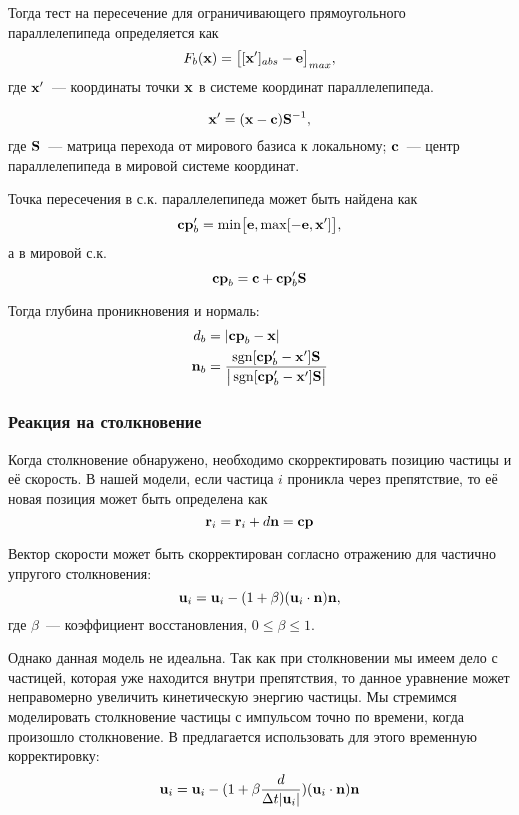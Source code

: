 Тогда тест на пересечение для ограничивающего прямоугольного параллелепипеда определяется как
\begin{equation}
  F_b(\boldsymbol{\mathbf{x}})=\big[[\boldsymbol{\mathbf{x}}']_{abs}-\boldsymbol{\mathbf{e}}\big]_{max},
\end{equation}
где $\boldsymbol{\mathbf{x}}'$~--- координаты точки $\boldsymbol{\mathbf{x}}$ в системе координат параллелепипеда.

\begin{equation}
  \boldsymbol{\mathbf{x}}'=(\boldsymbol{\mathbf{x}}-\boldsymbol{\mathbf{c}})\boldsymbol{\mathbf{S}}^{-1},
\end{equation}
где $\boldsymbol{\mathbf{S}}$~--- матрица перехода от мирового базиса к локальному; $\boldsymbol{\mathbf{c}}$~--- центр параллелепипеда в мировой системе координат.

Точка пересечения в с.к. параллелепипеда может быть найдена как
\begin{equation}
  \boldsymbol{\mathbf{cp}}'_b=\min\!\big[\boldsymbol{\mathbf{e}}, \max[-\boldsymbol{\mathbf{e}}, \boldsymbol{\mathbf{x}}']\big],
\end{equation}
а в мировой с.к.
\begin{equation}
  \boldsymbol{\mathbf{cp}}_b=\boldsymbol{\mathbf{c}}+\boldsymbol{\mathbf{cp}}'_b\boldsymbol{\mathbf{S}}
\end{equation}

Тогда глубина проникновения и нормаль:
\begin{align}
  d_b&=|\boldsymbol{\mathbf{cp}}_b-\boldsymbol{\mathbf{x}}|\\
  \boldsymbol{\mathbf{n}}_b&=\frac{\operatorname{sgn}[\boldsymbol{\mathbf{cp}}'_b-\boldsymbol{\mathbf{x}}']\boldsymbol{\mathbf{S}} }{\big|\operatorname{sgn}[\boldsymbol{\mathbf{cp}}'_b-\boldsymbol{\mathbf{x}}']\boldsymbol{\mathbf{S}}\big|}
\end{align}


\subsubsection{Реакция на столкновение}
Когда столкновение обнаружено, необходимо скорректировать позицию частицы и её скорость.
В нашей модели, если частица $i$ проникла через препятствие, то её новая позиция может быть определена как
\begin{equation} \label{eq:correct-position}
  \boldsymbol{\mathbf{r}}_i=\boldsymbol{\mathbf{r}}_i+d\boldsymbol{\mathbf{n}}=\boldsymbol{\mathbf{cp}}
\end{equation}

Вектор скорости может быть скорректирован согласно отражению для частично упругого столкновения:
\[ \boldsymbol{\mathbf{u}}_i=\boldsymbol{\mathbf{u}}_i-(1+\beta)(\boldsymbol{\mathbf{u}}_i\cdot \boldsymbol{\mathbf{n}})\boldsymbol{\mathbf{n}}, \]
где $\beta$~--- коэффициент восстановления, $0\leq \beta\leq1$.

Однако данная модель не идеальна. Так как при столкновении мы имеем дело с частицей, которая уже находится внутри препятствия, то данное уравнение может неправомерно увеличить кинетическую энергию частицы. Мы стремимся моделировать столкновение частицы с импульсом точно по времени, когда произошло столкновение. В \cite{kelager} предлагается использовать для этого временную корректировку:
\begin{equation} \label{eq:correct-velocity}
  \boldsymbol{\mathbf{u}}_i=\boldsymbol{\mathbf{u}}_i-(1+\beta\frac{d}{\Delta t|\boldsymbol{\mathbf{u}}_i|})(\boldsymbol{\mathbf{u}}_i\cdot \boldsymbol{\mathbf{n}})\boldsymbol{\mathbf{n}}
\end{equation}


